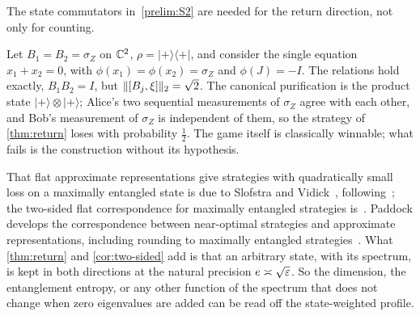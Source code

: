 The state commutators in~\ref{prelim:S2} are needed for the return direction, not only for counting.

\begin{example}\label{ex:return-needs-commutators}
Let $B_1=B_2=\sigma_Z$ on $\mathbb C^2$, $\rho=|{+}\rangle\langle{+}|$, and consider the single equation $x_1+x_2=0$, with $\phi(x_1)=\phi(x_2)=\sigma_Z$
and $\phi(J)=-I$. The relations hold exactly, $B_1B_2=I$, but $\lVert [B_j,\xi]\rVert_2=\sqrt2$. The canonical purification is the product state
$|{+}\rangle\otimes|{+}\rangle$; Alice's two sequential measurements of $\sigma_Z$ agree with each other, and Bob's measurement of
$\sigma_Z$ is independent of them, so the strategy of \cref{thm:return} loses with probability $\frac12$. The game itself is classically
winnable; what fails is the construction without its hypothesis.
\end{example}

\begin{remark}[Credits]\label{transfer:credits-return}
That flat approximate representations give strategies with quadratically small loss on a maximally entangled state is due to Slofstra and
Vidick~\cite[Proposition~4.4(a)]{SV18}, following~\cite[Proposition~3.4]{Slo19}; the two-sided flat correspondence for maximally
entangled strategies is~\cite[Corollary~4.6]{SV18}. Paddock develops the correspondence between near-optimal strategies and approximate
representations, including rounding to maximally entangled strategies~\cite{Pad22}. What \cref{thm:return} and \cref{cor:two-sided} add is
that an arbitrary state, with its spectrum, is kept in both directions at the natural precision $e\asymp\sqrt{\varepsilon}$. So the dimension, the
entanglement entropy, or any other function of the spectrum that does not change when zero eigenvalues are added can be read off the
state-weighted profile.
\end{remark}
